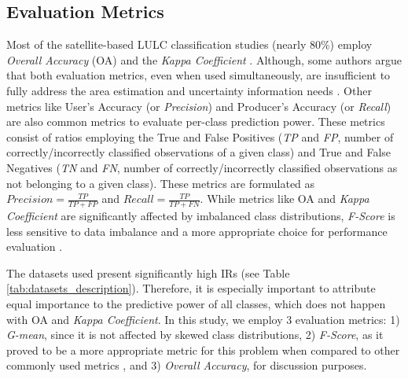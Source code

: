 \documentclass[parskip=full]{scrartcl}
\begin{document}
\subsection{Evaluation Metrics}
Most of the satellite-based LULC classification studies (nearly 80\%) employ
\textit{Overall Accuracy} (OA) and the \textit{Kappa Coefficient}
\cite{Gavade2019}. Although, some authors argue that both evaluation metrics,
even when used simultaneously, are insufficient to fully address the area
estimation and uncertainty information needs \cite{Olofsson2013,Pontius2011}.
Other metrics like User's Accuracy (or \textit{Precision}) and Producer's
Accuracy (or \textit{Recall}) are also common metrics to evaluate per-class
prediction power. These metrics consist of ratios employing the True and False
Positives (\textit{TP} and \textit{FP}, number of correctly/incorrectly
classified observations of a given class) and True and False Negatives
(\textit{TN} and \textit{FN}, number of correctly/incorrectly classified
observations as not belonging to a given class). These metrics are formulated as
$Precision = \frac{TP}{TP+FP}$ and $Recall = \frac{TP}{TP+FN}$. While metrics
like OA and \textit{Kappa Coefficient} are significantly affected by imbalanced
class distributions, \textit{F-Score} is less sensitive to data imbalance and a
more appropriate choice for performance evaluation \cite{Jeni2013}.

The datasets used present significantly high IRs (see Table
\ref{tab:datasets_description}). Therefore, it is especially important to
attribute equal importance to the predictive power of all classes, which does
not happen with OA and \textit{Kappa Coefficient}. In this study, we employ 3
evaluation metrics: 1) \textit{G-mean}, since it is not affected by skewed class
distributions, 2) \textit{F-Score}, as it proved to be a more appropriate metric
for this problem when compared to other commonly used metrics \cite{Jeni2013},
and 3) \textit{Overall Accuracy}, for discussion purposes.
\end{document}
